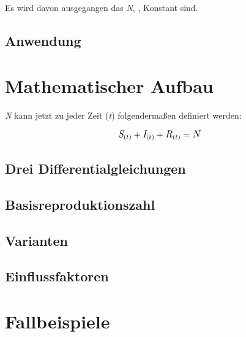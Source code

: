 \documentclass[12pt]{scrartcl} %
\begin{document}
Es wird davon ausgegangen das \textit{N}, \textalpha, \textbeta \space Konstant sind.


\subsection{Anwendung}


\newpage
\section{Mathematischer Aufbau}

\textit{N} kann jetzt zu jeder Zeit (\textit{t}) folgendermaßen definiert werden: \cite{3}


$$ \large\textit{S}_{(t)} + \textit{I}_{(t)} + \textit{R}_{(t)} = \textit{N}\normalsize $$


\subsection{Drei Differentialgleichungen}


\subsection{Basisreproduktionszahl}


\subsection{Varianten}


\subsection{Einflussfaktoren}


\section{Fallbeispiele}
\end{document}
